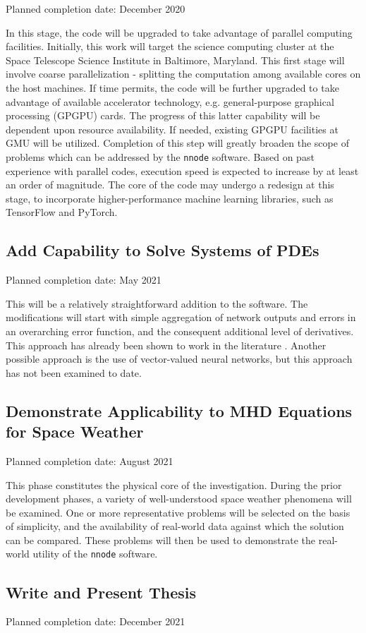\documentclass{article}
\begin{document}
Planned completion date: December 2020

In this stage, the code will be upgraded to take advantage of parallel computing facilities. Initially, this work will target the science computing cluster at the Space Telescope Science Institute in Baltimore, Maryland. This first stage will involve coarse parallelization - splitting the computation among available cores on the host machines. If time permits, the code will be further upgraded to take advantage of available accelerator technology, e.g. general-purpose graphical processing (GPGPU) cards. The progress of this latter capability will be dependent upon resource availability. If needed, existing GPGPU facilities at GMU will be utilized. Completion of this step will greatly broaden the scope of problems which can be addressed by the \texttt{nnode} software. Based on past experience with parallel codes, execution speed is expected to increase by at least an order of magnitude. The core of the code may undergo a redesign at this stage, to incorporate higher-performance machine learning libraries, such as TensorFlow and PyTorch.

\subsection{Add Capability to Solve Systems of PDEs}

Planned completion date: May 2021

This will be a relatively straightforward addition to the software. The modifications will start with simple aggregation of network outputs and errors in an overarching error function, and the consequent additional level of derivatives. This approach has already been shown to work in the literature \cite{Lagaris1998}. Another possible approach is the use of vector-valued neural networks, but this approach has not been examined to date.

\subsection{Demonstrate Applicability to MHD Equations for Space Weather}

Planned completion date: August 2021

This phase constitutes the physical core of the investigation. During the prior development phases, a variety of well-understood space weather phenomena will be examined. One or more representative problems will be selected on the basis of simplicity, and the availability of real-world data against which the solution can be compared. These problems will then be used to demonstrate the real-world utility of the \texttt{nnode} software.

\subsection{Write and Present Thesis}

Planned completion date: December 2021


\medskip

\printbibliography[heading=bibintoc]

\end{document}
